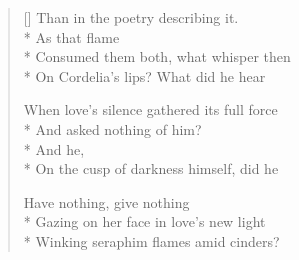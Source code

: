 \begin{verse}[\versewidth]
Than in the poetry describing it.\\*
\hspace*{3\vgap} As that flame\\*
Consumed them both, what whisper then\\*
On Cordelia's lips?  What did he hear

When love's silence gathered its full force\\*
And asked nothing of him?\\*
\hspace*{3\vgap} And he,\\*
On the cusp of darkness himself, did he

Have nothing, give nothing\\*
Gazing on her face in love's new light\\*
Winking seraphim flames amid cinders?
\end{verse}
